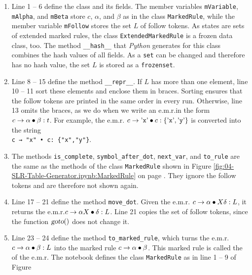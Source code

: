 \begin{enumerate}
\item Line 1 -- 6 define the class and its fields.  The member variables \texttt{mVariable}, \texttt{mAlpha}, and
      \texttt{mBeta} store $c$, $\alpha$, and $\beta$ as in the class \texttt{MarkedRule}, while the member
      variable \texttt{mFollow} stores the set $L$ of follow tokens.  As states are sets of extended marked rules,
      the class \texttt{ExtendedMarkedRule} is a frozen data class, too.  The method \texttt{\_\_hash\_\_} that
      \textsl{Python} generates for this class combines the hash values of all fields.  As a \texttt{set} can be
      changed and therefore has no hash value, the set $L$ is stored as a \texttt{frozenset}.
\item Line 8 -- 15 define the method \texttt{\_\_repr\_\_}.  If $L$ has more than one element, line 10 -- 11 sort
      these elements and enclose them in braces.  Sorting ensures that the follow tokens are printed in the same
      order in every run.  Otherwise, line 13 omits the braces, as we do when we write an e.m.r.\@ in the form
      $c \rightarrow \alpha \mdot \beta: t$.  For example, the e.m.r.\@
      $c \rightarrow \saquoted{x} \mdot c: \{\saquoted{x}, \saquoted{y}\}$ is converted into the string
      \\[0.2cm]
      \hspace*{1.3cm}
      \texttt{c → "x" • c: \{"x","y"\}}.
\item The methods \texttt{is\_complete}, \texttt{symbol\_after\_dot}, \texttt{next\_var}, and \texttt{to\_rule}
      are the same as the methods of the class \texttt{MarkedRule} shown in Figure
      \ref{fig:04-SLR-Table-Generator.ipynb:MarkedRule} on page \pageref{fig:04-SLR-Table-Generator.ipynb:MarkedRule}.
      They ignore the follow tokens and are therefore not shown again.
\item Line 17 -- 21 define the method \texttt{move\_dot}.  Given the e.m.r.\@
      $c \rightarrow \alpha \mdot X \delta: L$, it returns the e.m.r.\@ $c \rightarrow \alpha X \mdot \delta: L$.
      Line 21 copies the set of follow tokens, since the function $\textsl{goto}()$ does not change it.
\item Line 23 -- 24 define the method \texttt{to\_marked\_rule}, which turns the e.m.r.\@
      $c \rightarrow \alpha \mdot \beta: L$ into the marked rule $c \rightarrow \alpha \mdot \beta$.  This
      marked rule is called the  of the e.m.r.  The notebook
      defines the class \texttt{MarkedRule} as in line 1 -- 9 of Figure

\end{enumerate}

